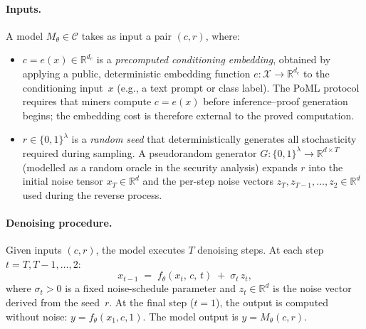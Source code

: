 \documentclass[11pt]{article}
\newcommand{\calC}{\mathcal{C}}
\newcommand{\calX}{\mathcal{X}}
\begin{document}
\paragraph{Inputs.}
A model $M_\theta \in \calC$ takes as input a pair $(c, r)$, where:
\begin{itemize}[nosep]
    \item $c = e(x) \in \mathbb{R}^{d_c}$ is a \emph{precomputed conditioning embedding}, obtained by applying a public, deterministic embedding function $e : \calX \to \mathbb{R}^{d_c}$ to the conditioning input~$x$ (e.g., a text prompt or class label). The PoML protocol requires that miners compute $c = e(x)$ before inference--proof generation begins; the embedding cost is therefore external to the proved computation.
    \item $r \in \{0,1\}^\lambda$ is a \emph{random seed} that deterministically generates all stochasticity required during sampling. A pseudorandom generator $G : \{0,1\}^\lambda \to \mathbb{R}^{d \times T}$ (modelled as a random oracle in the security analysis) expands $r$ into the initial noise tensor $x_T \in \mathbb{R}^d$ and the per-step noise vectors $z_T, z_{T-1}, \ldots, z_2 \in \mathbb{R}^d$ used during the reverse process.
\end{itemize}

\paragraph{Denoising procedure.}
Given inputs $(c, r)$, the model executes $T$ denoising steps. At each step $t = T, T{-}1, \ldots, 2$:
\begin{equation}
\label{eq:denoise-step}
    x_{t-1} \;=\; f_\theta(x_t,\, c,\, t) \;+\; \sigma_t\, z_t,
\end{equation}
where $\sigma_t > 0$ is a fixed noise-schedule parameter and $z_t \in \mathbb{R}^d$ is the noise vector derived from the seed~$r$. At the final step ($t = 1$), the output is computed without noise: $y = f_\theta(x_1, c, 1)$. The model output is $y = M_\theta(c, r)$.
\end{document}

